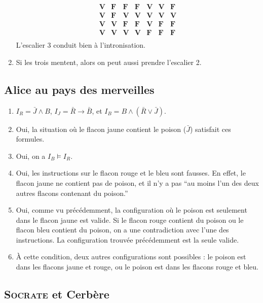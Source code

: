 \begin{enumerate}
\[\begin{array}{ccc|ccc|c}
				\mathbf{V} & \mathbf{F} & \mathbf{F} & \mathbf{F} & \mathbf{V} & \mathbf{V} & \mathbf{F}\\
				\mathbf{V} & \mathbf{F} & \mathbf{V} & \mathbf{V} & \mathbf{V} & \mathbf{V} & \mathbf{V}\\
				\mathbf{V} & \mathbf{V} & \mathbf{F} & \mathbf{F} & \mathbf{V} & \mathbf{F} & \mathbf{F}\\
				\mathbf{V} & \mathbf{V} & \mathbf{V} & \mathbf{V} & \mathbf{F} & \mathbf{F} & \mathbf{F}\\
			\end{array}
		\] L'escalier 3 conduit bien à l'intronisation.
	\item Si les trois mentent, alors on peut aussi prendre l'escalier 2.
\end{enumerate}

\subsection{Alice au pays des merveilles}

\begin{enumerate}
	\item $I_R = \bar{J} \land B$, $I_J = \bar{R} \to \bar{B}$, et $I_B = B \land (\bar{R} \lor \bar{J})$.
	\item Oui, la situation où le flacon jaune contient le poison ($\bar{J}$) satisfait ces formules.
	\item Oui, on a $I_B \models I_R$.
	\item Oui, les instructions sur le flacon rouge et le bleu sont fausses. En effet, le flacon jaune ne contient pas de poison, et il n'y a pas ``au moins l'un des deux autres flacons contenant du poison.''
	\item Oui, comme vu précédemment, la configuration où le poison est seulement dans le flacon jaune est valide. Si le flacon rouge contient du poison ou le flacon bleu contient du poison, on a une contradiction avec l'une des instructions. La configuration trouvée précédemment est la seule valide.
	\item À cette condition, deux autres configurations sont possibles : le poison est dans les flacons jaune et rouge, ou le poison est dans les flacons rouge et bleu.
\end{enumerate}

\subsection{\textsc{Socrate} et Cerbère}

